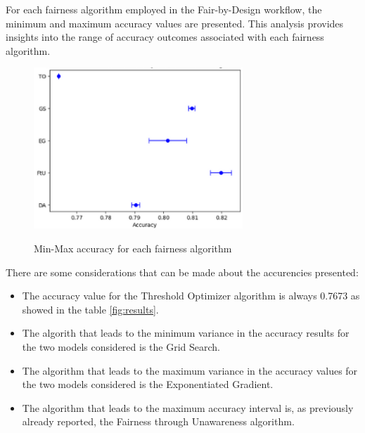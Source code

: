 For each fairness algorithm employed in the Fair-by-Design workflow, the minimum and maximum accuracy values are presented. This analysis provides insights into the range of accuracy outcomes associated with each fairness algorithm.

\begin{figure}[H]
    \centering
    \includegraphics[width=0.7\textwidth, height=0.7\textwidth]{accuracy.png}
    \label{fig:acc_alg}
    \caption{Min-Max accuracy for each fairness algorithm}
\end{figure}

There are some considerations that can be made about the accurencies presented:
\begin{itemize}
    \item The accuracy value for the Threshold Optimizer algorithm is always 0.7673 as showed in the table \cref{fig:results}.
    \item The algorith that leads to the minimum variance in the accuracy results for the two models considered is the Grid Search.
    \item The algorithm that leads to the maximum variance in the accuracy values for the two models considered is the Exponentiated Gradient.
    \item The algorithm that leads to the maximum accuracy interval is, as previously already reported, the Fairness through Unawareness algorithm.
\end{itemize}

